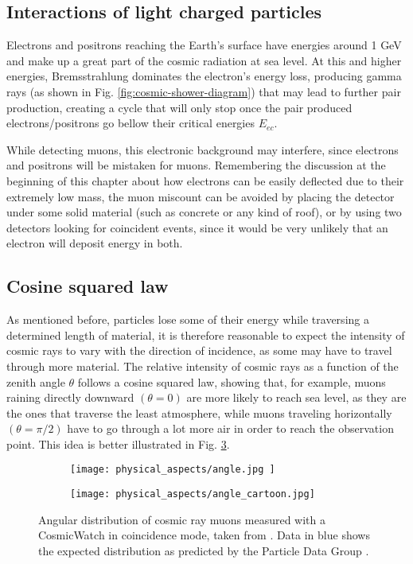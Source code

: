\subsection{Interactions of light charged particles}

Electrons and positrons reaching the Earth's surface have energies around 1 \unit{\giga\eV} and make up a great part of the cosmic radiation at sea level. At this and higher energies, Bremsstrahlung dominates the electron's energy loss, producing gamma rays (as shown in Fig. \ref{fig:cosmic-shower-diagram}) that may lead to further pair production, creating a cycle that will only stop once the pair produced electrons/positrons go bellow their critical energies $E_{ec}$. 

While detecting muons, this electronic background may interfere, since electrons and positrons will be mistaken for muons. Remembering the discussion at the beginning of this chapter about how electrons can be easily deflected due to their extremely low mass, the muon miscount can be avoided by placing the detector under some solid material (such as concrete or any kind of roof), or by using two detectors looking for coincident events, since it would be very unlikely that an electron will deposit energy in both.

\subsection{Cosine squared law}

As mentioned before, particles lose some of their energy while traversing a determined length of material, it is therefore reasonable to expect the intensity of cosmic rays to vary with the direction of incidence, as some may have to travel through more material. The relative intensity of cosmic rays as a function of the zenith angle $\theta$ follows a cosine squared law, showing that, for example, muons raining directly downward $(\theta=0)$ are more likely to reach sea level, as they are the ones that traverse the least atmosphere, while muons traveling horizontally $(\theta=\pi/2)$ have to go through a lot more air in order to reach the observation point. This idea is better illustrated in Fig. \ref{fig:cosine_sqrd}.

\begin{figure}[H]
  \centering
  \begin{subfigure}[t]{0.48\textwidth}
    \texttt{[image: physical\_aspects/angle.jpg ]}
    \caption{\label{sfig:cosine_sqrd_law}}
  \end{subfigure}
  \medskip
  \centering
  \begin{subfigure}[t]{0.48\textwidth}
    \texttt{[image: physical\_aspects/angle\_cartoon.jpg]}
    \caption{\label{sfig:cosine_sqrd_cartoomn}}
  \end{subfigure}
  \caption{\label{fig:cosine_sqrd}Angular distribution of cosmic ray muons measured with a CosmicWatch in coincidence mode, taken from \cite{CosmicWatch}. Data in blue shows the expected distribution as predicted by the Particle Data Group \cite{PDG}.}
\end{figure}